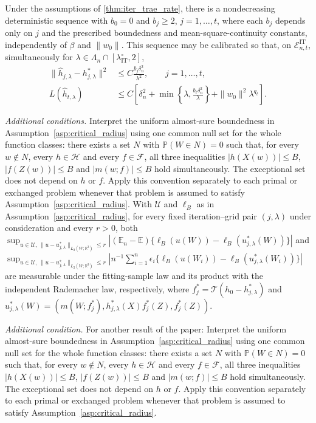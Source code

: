 \begin{lemma}
Under the assumptions of \cref{thm:iter_trae_rate}, there is a nondecreasing deterministic sequence with $b_0=0$ and $b_j\geqslant2$, $j=1,\ldots,t$, where each $b_j$ depends only on $j$ and the prescribed boundedness and mean-square-continuity constants, independently of $\beta$ and $\|w_0\|$. This sequence may be calibrated so that, on $\mathcal E_{n,t}^{\mathrm{IT}}$, simultaneously for $\lambda\in\Lambda_n\cap[\lambda_{\mathrm{IT}}^\circ,2]$,
\begin{align}
\|\hat h_{j,\lambda}-h_{j,\lambda}^*\|^2
&\leqslant C\frac{b_j\delta_n^2}{\lambda^2},
\qquad j=1,\ldots,t,
\label{eq:iter_trae_strong_propagation}\\
L(\hat h_{t,\lambda})
&\leqslant C\left[
\delta_n^2+\min\left\{\lambda,
\frac{b_t\delta_n^2}{\lambda}\right\}
+\|w_0\|^2\lambda^{q_t}
\right].
\label{eq:iter_trae_weak_propagation}
\end{align}

\emph{Additional conditions.} Interpret the uniform almost-sure boundedness in Assumption~\ref{asp:critical_radius} using one common null set for the whole function classes: there exists a set $N$ with $\mathbb P(W\in N)=0$ such that, for every $w\notin N$, every $h\in\mathcal H$ and every $f\in\mathcal F$, all three inequalities $|h(X(w))|\leqslant B$, $|f(Z(w))|\leqslant B$ and $|m(w;f)|\leqslant B$ hold simultaneously. The exceptional set does not depend on $h$ or $f$. Apply this convention separately to each primal or exchanged problem whenever that problem is assumed to satisfy Assumption~\ref{asp:critical_radius}. With $\mathcal U$ and $\ell_B$ as in Assumption~\ref{asp:critical_radius}, for every fixed iteration--grid pair $(j,\lambda)$ under consideration and every $r>0$, both $\sup_{u\in\mathcal U,\,\|u-u_{j,\lambda}^*\|_{L_2(W;\mathbb R^3)}\leqslant r}|(\mathbb E_n-\mathbb E)\{\ell_B(u(W))-\ell_B(u_{j,\lambda}^*(W))\}|$ and $\sup_{u\in\mathcal U,\,\|u-u_{j,\lambda}^*\|_{L_2(W;\mathbb R^3)}\leqslant r}|n^{-1}\sum_{i=1}^n\epsilon_i\{\ell_B(u(W_i))-\ell_B(u_{j,\lambda}^*(W_i))\}|$ are measurable under the fitting-sample law and its product with the independent Rademacher law, respectively, where $f_j^*=\mathcal T(h_0-h_{j,\lambda}^*)$ and $u_{j,\lambda}^*(W)=(m(W;f_j^*),h_{j,\lambda}^*(X)f_j^*(Z),f_j^*(Z))$.
\end{lemma}

\emph{Additional condition.} For another result of the paper: Interpret the uniform almost-sure boundedness in Assumption~\ref{asp:critical_radius} using one common null set for the whole function classes: there exists a set $N$ with $\mathbb P(W\in N)=0$ such that, for every $w\notin N$, every $h\in\mathcal H$ and every $f\in\mathcal F$, all three inequalities $|h(X(w))|\leqslant B$, $|f(Z(w))|\leqslant B$ and $|m(w;f)|\leqslant B$ hold simultaneously. The exceptional set does not depend on $h$ or $f$. Apply this convention separately to each primal or exchanged problem whenever that problem is assumed to satisfy Assumption~\ref{asp:critical_radius}.


